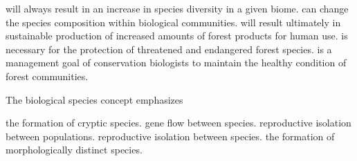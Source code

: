 \begin{choices}
\choice will always result in an increase in species diversity in a given biome.%
\correctchoice can change the species composition within biological communities.%
\choice will result ultimately in sustainable production of increased amounts of forest products for human use.%
\choice is necessary for the protection of threatened and endangered forest species.%
\choice is a management goal of conservation biologists to maintain the healthy condition of forest communities.%
\end{choices}


\question
The biological species concept emphasizes

\begin{choices}
\choice the formation of cryptic species.%
\choice gene flow between species.%
\choice reproductive isolation between populations.%
\choice reproductive isolation between species.%
\choice the formation of morphologically distinct species.%
\end{choices}

